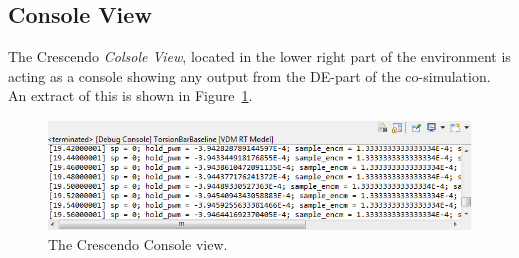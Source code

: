 \documentclass{crescendorepchap}
\begin{document}
\subsection{Console View}

The Crescendo \emph{Colsole View}, located in the lower right part of the
environment is acting as a console showing any output from the DE-part of
the co-simulation.
An extract of this is shown in Figure~\ref{fig:consoleview}.

\begin{figure}[htbp]
\centering
\includegraphics[width=.6\textwidth]{images/DestecsConsoleView.png}
\caption{The Crescendo Console view.\label{fig:consoleview}}
\end{figure}





\end{document}
